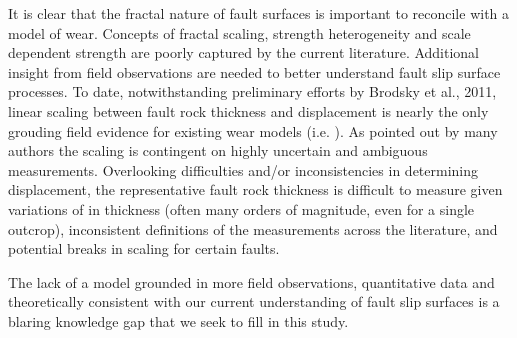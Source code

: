 \documentclass[12pt,a4paper]{article}
\begin{document}

It is clear that the fractal nature of fault surfaces is important to reconcile with a model of wear. Concepts of fractal scaling, strength heterogeneity and scale dependent strength are poorly captured by the current literature. Additional insight from field observations are needed to better understand fault slip surface processes. To date, notwithstanding preliminary efforts by Brodsky et al., 2011, linear scaling between fault rock thickness and displacement is nearly the only grouding field evidence for existing wear models (i.e. \cite{scholz1987wear, wang1994wear, power1988roughness}). As pointed out by many authors \cite{blenkinsop1989thickness, evans1990thickness, shipton2006thick} the scaling is contingent on highly uncertain and ambiguous measurements. Overlooking difficulties and/or inconsistencies in determining displacement, the representative fault rock thickness is difficult to measure given variations of in thickness (often many orders of magnitude, even for a single outcrop), inconsistent definitions of the measurements across the literature, and potential breaks in scaling for certain faults. 

The lack of a model grounded in more field observations, quantitative data and theoretically consistent with our current understanding of fault slip surfaces is a blaring knowledge gap that we seek to fill in this study. 

\end{document}

